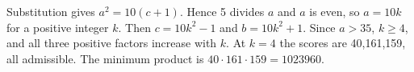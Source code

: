 Substitution gives $a^2=10(c+1)$. Hence 5 divides $a$ and $a$ is even, so $a=10k$ for a positive integer $k$. Then $c=10k^2-1$ and $b=10k^2+1$. Since $a>35$, $k\ge4$, and all three positive factors increase with $k$. At $k=4$ the scores are 40,161,159, all admissible. The minimum product is $\boxed{40\cdot161\cdot159=1023960}$.
